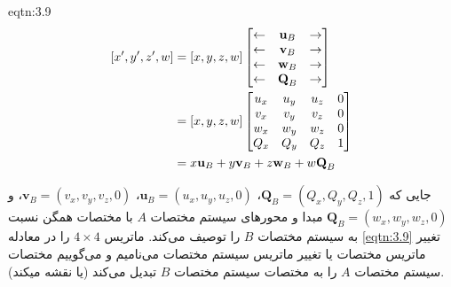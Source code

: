 {\begin{spacing}{1.5}
        \begin{eqtn}{eqtn:3.9}
            \begin{equation*}
                \centering
                \begin{split}
                [x^\prime,y^\prime,z^\prime,w]
                    &=[x,y,z,w]\begin{bmatrix}
                                   \leftarrow & \textbf{u}_{B} & \rightarrow \\
                                   \leftarrow & \textbf{v}_{B} & \rightarrow \\
                                   \leftarrow & \textbf{w}_{B} & \rightarrow \\
                                   \leftarrow & \textbf{Q}_{B} & \rightarrow
                    \end{bmatrix} \\
                    &=[x,y,z,w]\begin{bmatrix}
                                   u_{x} & u_{y} & u_{z} & 0 \\
                                   v_{x} & v_{y} & v_{z} & 0 \\
                                   w_{x} & w_{y} & w_{z} & 0 \\
                                   Q_{x} & Q_{y} & Q_{z} & 1
                    \end{bmatrix} \\
                    &=x\textbf{u}_{B}+y\textbf{v}_{B}+z\textbf{w}_{B}+w\textbf{Q}_{B}
                \end{split}
            \end{equation*}
            \centering
        \end{eqtn}

        جایی که $\textbf{Q}_{B}=(Q_{x}, Q_{y}, Q_{z}, 1)$، $\textbf{u}_{B}=(u_{x}, u_{y}, u_{z}, 0)$، $\textbf{v}_{B}=(v_{x}, v_{y}, v_{z}, 0)$، و $\textbf{Q}_{B}=(w_{x}, w_{y}, w_{z}, 0)$ مبدا و محورهای سیستم مختصات $A$ با مختصات همگن نسبت به سیستم مختصات $B$ را توصیف می‌کند.
        ماتریس $4\times 4$ را در معادله \ref{eqtn:3.9} تغییر ماتریس مختصات یا تغییر ماتریس سیستم مختصات می‌نامیم و می‌گوییم مختصات سیستم مختصات $A$ را به مختصات سیستم مختصات $B$ تبدیل می‌کند (یا نقشه میکند).
    \end{spacing}
}


